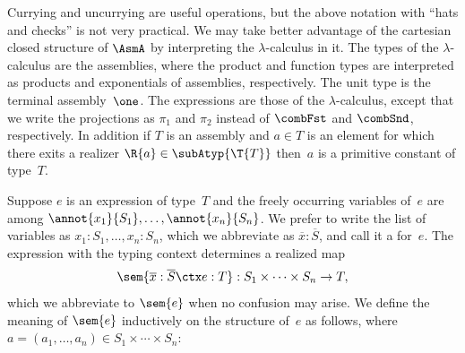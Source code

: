 Currying and uncurrying are useful operations, but the above notation
with ``hats and checks'' is not very practical. We may take better
advantage of the cartesian closed structure of $\AsmA$ by interpreting
the $\lambda$-calculus in it. The types of the $\lambda$-calculus are
the assemblies, where the product and function types are interpreted
as products and exponentials of assemblies, respectively. The unit
type is the terminal assembly~$\one$. The expressions are those of the
$\lambda$-calculus, except that we write the projections as $\pi_1$
and $\pi_2$ instead of $\combFst$ and $\combSnd$, respectively. In
addition if $T$ is an assembly and $a \in T$ is an element for
which there exits a realizer $\R{a} \in \subAtyp{\T{T}}$ then~$a$ is a
primitive constant of type~$T$.

Suppose $e$ is an expression of type~$T$ and the freely
occurring variables of~$e$ are among $\annot{x_1}{S_1}, \ldots,
\annot{x_n}{S_n}$. We prefer to write the list of variables as
$x_1 : S_1, \ldots, x_n : S_n$, which we abbreviate as
$\overline{x} : \overline{S}$, and call it a  for~$e$. The expression with the typing context determines
a realized map
%
\begin{equation*}
  \sem{\overline{x} : \overline{S} \ctx e : T} :
  S_1 \times \cdots \times S_n \to T,
\end{equation*}
%
which we abbreviate to $\sem{e}$ when no confusion may arise. We
define the meaning of $\sem{e}$ inductively on the structure of~$e$ as
follows, where $a = (a_1, \ldots, a_n) \in S_1 \times \cdots \times
S_n$:
%
